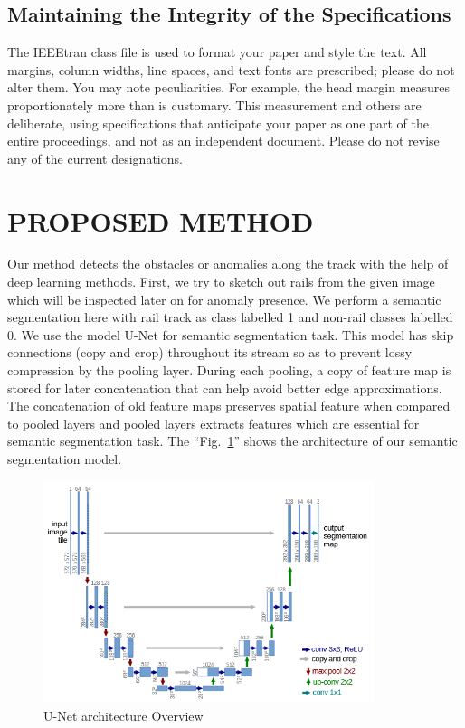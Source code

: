 \documentclass[conference]{IEEEtran}
\begin{document}
\subsection{Maintaining the Integrity of the Specifications}

The IEEEtran class file is used to format your paper and style the text. All margins, 
column widths, line spaces, and text fonts are prescribed; please do not 
alter them. You may note peculiarities. For example, the head margin
measures proportionately more than is customary. This measurement 
and others are deliberate, using specifications that anticipate your paper 
as one part of the entire proceedings, and not as an independent document. 
Please do not revise any of the current designations.

\section{PROPOSED METHOD}
Our method detects the obstacles or anomalies along the track with the help of deep learning methods. First, we try to sketch out rails from the given image which will be inspected later on for anomaly presence. We perform a semantic segmentation here with rail track as class labelled 1 and non-rail classes labelled 0. We use the model U-Net \cite{ronneberger2015unet} for semantic segmentation task. This model has skip connections (copy and crop) throughout its stream so as to prevent lossy compression by the pooling layer. During each pooling, a copy of feature map is stored for later concatenation that can help avoid better edge approximations. The concatenation of old feature maps preserves spatial feature when compared to pooled layers and pooled layers extracts features which are essential for semantic segmentation task. The ``Fig.~\ref{U-Net}'' shows the architecture of our semantic segmentation model.
\begin{figure}[htbp]
\centerline{\includegraphics[height=6.5cm]{U-Net_model.png}}
\caption{U-Net architecture Overview}
\label{U-Net}
\end{figure} 
\end{document}
